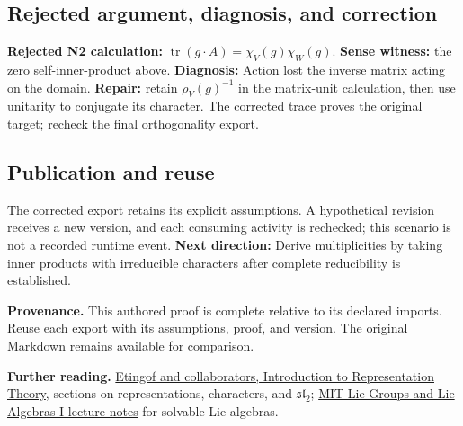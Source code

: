 \documentclass[preprint,12pt,aps,pra,showkeys,amsmath,amssymb,superscriptaddress,floatfix]{revtex4-2}
\theoremstyle{definition}
\theoremstyle{remark}
\begin{document}
\subsection{Rejected argument, diagnosis, and correction}
\textbf{Rejected N2 calculation:}
\(\operatorname{tr}(g\cdot A)=\chi_V(g)\chi_W(g)\). \textbf{Sense
witness:} the zero self-inner-product above. \textbf{Diagnosis:} Action
lost the inverse matrix acting on the domain. \textbf{Repair:} retain
\(\rho_V(g)^{-1}\) in the matrix-unit calculation, then use unitarity to
conjugate its character. The corrected trace proves the original target;
recheck the final orthogonality export.

\subsection{Publication and reuse}
The corrected export retains its explicit assumptions. A hypothetical
revision receives a new version, and each consuming activity is
rechecked; this scenario is not a recorded runtime event. \textbf{Next
direction:} Derive multiplicities by taking inner products with
irreducible characters after complete reducibility is established.

\par\medskip\begingroup\small\linespread{1.0}\selectfont\noindent\textbf{Provenance.} This authored proof is complete relative to its declared imports. Reuse
each export with its assumptions, proof, and version. The original
Markdown remains available for comparison.
\par\endgroup

\par\smallskip\begingroup\small\linespread{1.0}\selectfont\noindent\textbf{Further reading.} \href{https://math.mit.edu/~etingof/reprbook.pdf}{Etingof and
collaborators, Introduction to Representation Theory}, sections on
representations, characters, and \(\mathfrak{sl}_2\);
\href{https://ocw.mit.edu/courses/18-745-lie-groups-and-lie-algebras-i-fall-2020/lists/lecture-notes/}{MIT
Lie Groups and Lie Algebras I lecture notes} for solvable Lie algebras.\par\endgroup
\end{document}
